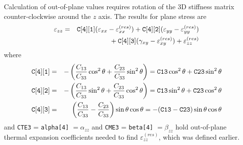 \documentclass[11pt]{book}
\def\a#1{\alpha_{#1}}
\def\b#1{\beta_{#1}}
\def\code#1{{\small\tt #1}}
\def\e#1{\varepsilon_{#1}}
\def\er#1{\varepsilon_{#1}^{(res)}}
\def\g#1{\gamma_{#1}}
\begin{document}
Calculation of out-of-plane values requires rotation of the 3D stiffness matrix counter-clockwise around the $z$ axis. The results for plane stress are
\begin{eqnarray}
     \e{zz} & = & \code{C[4][1]} (\e{xx} - \er{xx}) +  \code{C[4][2]}(\e{yy} -\er{yy}) 
     \nonumber \\
     && \qquad\qquad\mbox{}
                 + \code{C[4][3]}(\g{xy}-\er{xy})  + \er{zz}
\end{eqnarray}
where 
\begin{eqnarray}
 \code{C[4][1]} & = &-\left({C_{13}\over C_{33}}\cos^2\theta + {C_{23}\over C_{33}}\sin^2\theta\right)
        = \code{C13}\cos^2\theta + \code{C23}\sin^2\theta  \\
 \code{C[4][2]} & = &-\left({C_{13}\over C_{33}}\sin^2\theta + {C_{23}\over C_{33}}\cos^2\theta\right)
        = \code{C13}\sin^2\theta + \code{C23}\cos^2\theta  \\
 \code{C[4][3]} & = &  \left({C_{13}\over C_{33}} - {C_{23}\over C_{33}}\right)\sin\theta\cos\theta
        = -(\code{C13}-\code{C23})\sin\theta\cos\theta
\end{eqnarray}
and \code{CTE3} = \code{alpha[4]} $=\a{zz}$ and \code{CME3} = \code{beta[4]} $=\b{zz}$ hold out-of-plane thermal expansion coefficients needed to find $\er{zz}$, which was defined earlier.
\end{document}
